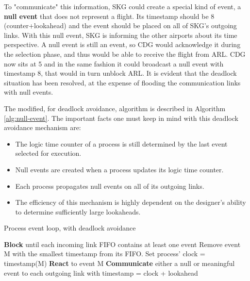 \documentclass[11pt]{article}
\begin{document}
To "communicate" this information, SKG could create a special kind of event, a \textbf{null event} that does not represent a flight. 
Its timestamp should be 8 (counter+lookahead) and the event should be placed on all of SKG's outgoing links.
With this null event, SKG is informing the other airports about its time perspective.
A null event is still an event, so CDG would acknowledge it during the selection phase, and thus would be able to receive the flight from ARL.
CDG now sits at 5 and in the same fashion it could broadcast a null event with timestamp 8, that would in turn unblock ARL.
It is evident that the deadlock situation has been resolved, at the expense of flooding the communication links with null events.

The modified, for deadlock avoidance, algorithm is described in Algorithm \ref{alg:null-event}.
The important facts one must keep in mind with this deadlock avoidance mechanism are:
\begin{itemize}
\item The logic time counter of a process is still determined by the last event selected for execution.
\item Null events are created when a process updates its logic time counter.
\item Each process propagates null events on all of its outgoing links.
\item The efficiency of this mechanism is highly dependent on the designer's ability to determine sufficiently large lookaheads.
\end{itemize}

\begin{LATEX}
\begin{algorithm}
\caption{Process event loop, with deadlock avoidance}
\label{alg:null-event}
\begin{algorithmic}[1]

      \State \textbf{Block} until each incoming link FIFO contains at least one event
      \State Remove event M with the smallest timestamp from its FIFO.
      \State Set process' clock = timestamp(M)
      \State \textbf{React} to event M
      \State \textbf{Communicate} either a null or meaningful event to each outgoing link with timestamp = clock + lookahead
   \EndWhile

\end{algorithmic}
\end{algorithm}
\end{LATEX}
\end{document}
